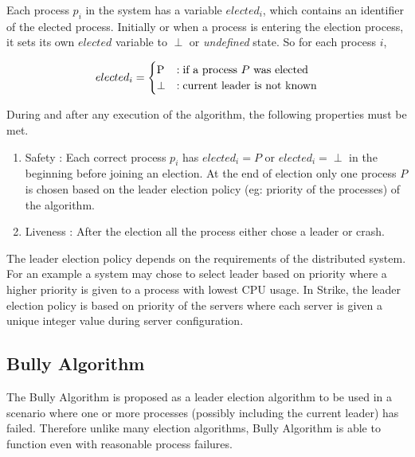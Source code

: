 \documentclass[dareport.tex]{subfiles}
\begin{document}
Each process $p_i$ in the system has a variable $elected_i$, which contains an identifier of the elected process. Initially or when a process is entering the election process, it sets its own $elected$ variable to $\perp$ or \emph{undefined} state. So for each process $i$,

\begin{equation*}
	elected_i =
		\begin{cases}
			\text{P} &: \text{if a process $ P $ was elected}\\
			\text{$\perp$} &: \text{current leader is not known}
		\end{cases}
\end{equation*}

During and after any execution of the algorithm, the following properties must be met.
\begin{enumerate}
\item Safety : Each correct process $p_i$ has $elected_i = P$ or $elected_i = \perp$ in the beginning before joining an election. At the end of election only one process $P$ is chosen based on the leader election policy (eg: priority of the processes) of the algorithm.
\item Liveness : After the election all the process either chose a leader or crash.
\end{enumerate}

The leader election policy depends on the requirements of the distributed system. For an example a system may chose to select leader based on priority where a higher priority is given to a process with lowest CPU usage. In Strike, the leader election policy is based on priority of the servers where each server is given a unique integer value during server configuration.
\subsection{Bully Algorithm} \label{ssec:bully}
The Bully Algorithm\cite{election} is proposed as a leader election algorithm to be used in a scenario where one or more processes (possibly including the current leader) has failed. Therefore unlike many election algorithms, Bully Algorithm is able to function even with reasonable process failures.
\end{document}
